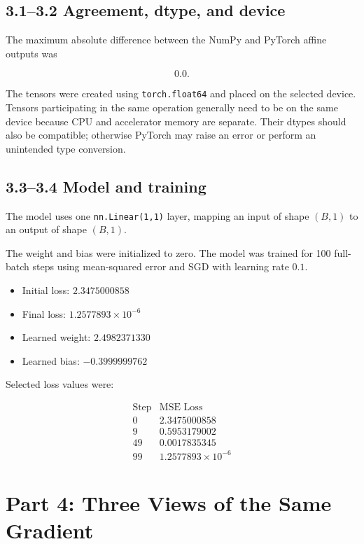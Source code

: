 \documentclass[11pt]{article}
\begin{document}
\subsection*{3.1--3.2 Agreement, dtype, and device}


The maximum absolute difference between the NumPy and PyTorch
affine outputs was

\[
0.0.
\]

The tensors were created using \texttt{torch.float64} and placed on the
selected device. Tensors participating in the same operation generally need
to be on the same device because CPU and accelerator memory are separate.
Their dtypes should also be compatible; otherwise PyTorch may raise an error
or perform an unintended type conversion.
\subsection*{3.3--3.4 Model and training}
The model uses one \texttt{nn.Linear(1,1)} layer, mapping an input
of shape $(B,1)$ to an output of shape $(B,1)$.

The weight and bias were initialized to zero. The model was trained
for 100 full-batch steps using mean-squared error and SGD with
learning rate $0.1$.

\begin{itemize}
    \item Initial loss: $2.3475000858$
    \item Final loss: $1.2577893 \times 10^{-6}$
    \item Learned weight: $2.4982371330$
    \item Learned bias: $-0.3999999762$
\end{itemize}

Selected loss values were:

\[
\begin{array}{c|c}
\text{Step} & \text{MSE Loss} \\
\hline
0  & 2.3475000858 \\
9  & 0.5953179002 \\
49 & 0.0017835345 \\
99 & 1.2577893 \times 10^{-6}
\end{array}
\]

\section*{Part 4: Three Views of the Same Gradient}
\end{document}
